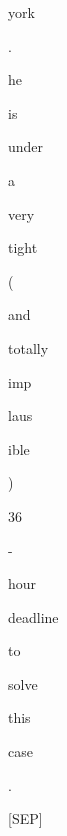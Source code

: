 \documentclass[varwidth=150mm]{standalone}
\begin{document}
\begin{CJK*}{UTF8}{gbsn}
{{{\colorbox{red!16.598169326782227}{\strut york} \colorbox{red!0.0}{\strut .} \colorbox{red!13.695891380310059}{\strut he} \colorbox{red!39.76738739013672}{\strut is} \colorbox{red!0.0}{\strut under} \colorbox{red!2.8499650955200195}{\strut a} \colorbox{red!1.6984540224075317}{\strut very} \colorbox{red!0.0}{\strut tight} \colorbox{red!4.440593242645264}{\strut (} \colorbox{red!2.8220160007476807}{\strut and} \colorbox{red!8.943391799926758}{\strut totally} \colorbox{red!1.3157800436019897}{\strut imp}\colorbox{red!6.8279643058776855}{\strut laus}\colorbox{red!2.92683482170105}{\strut ible} \colorbox{red!1.6281511783599854}{\strut )} \colorbox{red!2.118187189102173}{\strut 36} \colorbox{red!3.33152437210083}{\strut -} \colorbox{red!2.08555006980896}{\strut hour} \colorbox{red!2.735473871231079}{\strut deadline} \colorbox{red!1.4913326501846313}{\strut to} \colorbox{red!1.6720870733261108}{\strut solve} \colorbox{red!11.030830383300781}{\strut this} \colorbox{red!3.3694422245025635}{\strut case} \colorbox{red!0.0}{\strut .} \colorbox{red!2.3154075145721436}{\strut [SEP]}
}}}
\end{CJK*}
\end{document}
